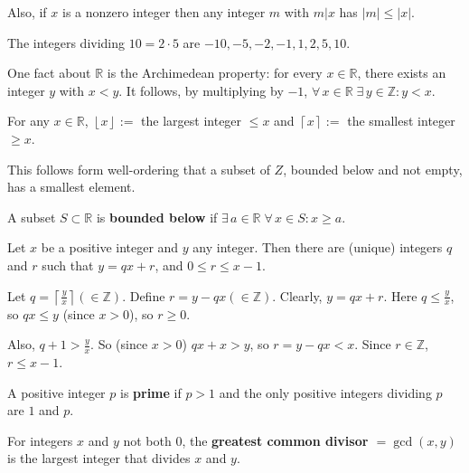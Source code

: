 \documentclass{notes}
\begin{document}
Also, if $x$ is a nonzero integer then any integer $m$ with $m \vert x$ has $\left | m \right | \leq \left | x \right |$.

\begin{eg}
  The integers dividing $10 = 2 \cdot 5$ are $-10, -5, -2, -1, 1, 2, 5, 10$.
\end{eg}

\begin{rmk}
  One fact about $\mathbb R$ is the Archimedean property: for every $x \in \mathbb R$, there exists an integer $y$ with $x < y$.
  It follows, by multiplying by $-1$, $\forall \, x \in \mathbb R \; \exists \, y \in \mathbb Z: y < x$.
\end{rmk}

\underline{} For any $x \in \mathbb R$, $\left \lfloor x \right \rfloor :=$ the largest integer $\leq x$ and $\left \lceil x \right \rceil :=$ the smallest integer $\geq x$.

This follows form well-ordering that a subset of $Z$, bounded below and not empty, has a smallest element.

\begin{defn}
  A subset $S \subset \mathbb R$ is {\boldmath \bfseries bounded below} if $\exists \, a \in \mathbb R \; \forall \, x \in S: x \geq a$.
\end{defn}

\begin{thm}
  Let $x$ be a positive integer and $y$ any integer.
  Then there are (unique) integers $q$ and $r$ such that $y = q x + r$, and $0 \leq r \leq x - 1$.
\end{thm}

\begin{prf}
  Let $q = \left \lceil \frac{y}{x} \right \rceil (\in \mathbb Z)$.
  Define $r = y - q x (\in \mathbb Z)$.
  Clearly, $y = q x + r$.
  Here $q \leq \frac{y}{x}$, so $q x \leq y$ (since $x > 0$), so $r \geq 0$.

  Also, $q + 1 > \frac{y}{x}$.
  So (since $x > 0$) $q x + x > y$, so $r = y - q x < x$.
  Since $r \in \mathbb Z$, $r \leq x - 1$.
\end{prf}

\begin{defn}
  A positive integer $p$ is {\boldmath \bfseries prime} if $p > 1$ and the only positive integers dividing $p$ are $1$ and $p$.
\end{defn}

\begin{defn}
  For integers $x$ and $y$ not both $0$, the {\boldmath \bfseries greatest common divisor $= \gcd(x, y)$} is the largest integer that divides $x$ and $y$.
\end{defn}
\end{document}
